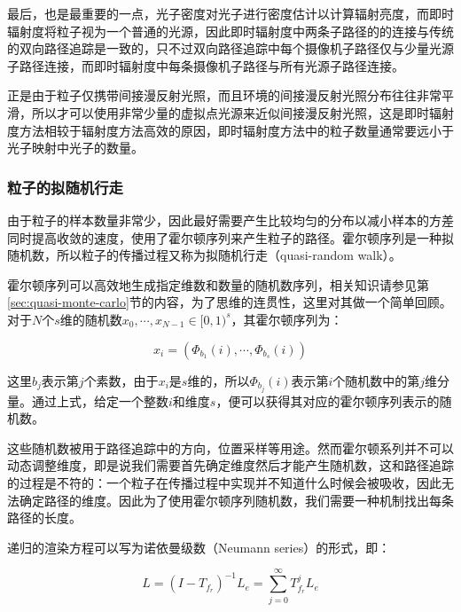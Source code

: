 最后，也是最重要的一点，光子密度对光子进行密度估计以计算辐射亮度，而即时辐射度将粒子视为一个普通的光源，因此即时辐射度中两条子路径的的连接与传统的双向路径追踪是一致的，只不过双向路径追踪中每个摄像机子路径仅与少量光源子路径连接，而即时辐射度中每条摄像机子路径与所有光源子路径连接。

正是由于粒子仅携带间接漫反射光照，而且环境的间接漫反射光照分布往往非常平滑，所以才可以使用非常少量的虚拟点光源来近似间接漫反射光照，这是即时辐射度方法相较于辐射度方法高效的原因，即时辐射度方法中的粒子数量通常要远小于光子映射中光子的数量。




\subsubsection{粒子的拟随机行走}
由于粒子的样本数量非常少，因此最好需要产生比较均匀的分布以减小样本的方差同时提高收敛的速度，\cite{a:InstantRadiosity}使用了霍尔顿序列来产生粒子的路径。霍尔顿序列是一种拟随机数，所以粒子的传播过程又称为拟随机行走（quasi-random walk）\cite{a:Quasi-MonteCarloRadiosity}。

霍尔顿序列可以高效地生成指定维数和数量的随机数序列，相关知识请参见第\ref{sec:quasi-monte-carlo}节的内容，为了思维的连贯性，这里对其做一个简单回顾。对于$N$个$s$维的随机数$x_0,\cdots,x_{N-1}\in [0,1)^{s}$，其霍尔顿序列为：

\begin{equation}\label{e:ir-halton-sequence}
	x_i=(\Phi_{b_1}(i),\cdots,\Phi_{b_s}(i))
\end{equation}

\noindent 这里$b_j$表示第$j$个素数，由于$x_i$是$s$维的，所以$\Phi_{b_j}(i)$表示第$i$个随机数中的第$j$维分量。通过上式，给定一个整数$i$和维度$s$，便可以获得其对应的霍尔顿序列表示的随机数。

这些随机数被用于路径追踪中的方向，位置采样等用途。然而霍尔顿系列并不可以动态调整维度，即是说我们需要首先确定维度然后才能产生随机数，这和路径追踪的过程是不符的：一个粒子在传播过程中实现并不知道什么时候会被吸收，因此无法确定路径的维度。因此为了使用霍尔顿序列随机数，我们需要一种机制找出每条路径的长度。

递归的渲染方程可以写为诺依曼级数（Neumann series）的形式，即：

\begin{equation}\label{e:ir-transport-operator}
	L=(I-T_{f_r})^{-1}L_e=\sum^{\infty}_{j=0}T^{j}_{f_r}L_e
\end{equation}

